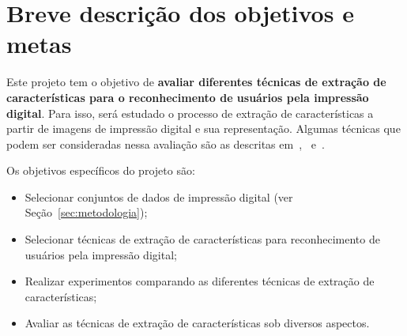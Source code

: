 \section{Breve descrição dos objetivos e metas}
\label{sec:objetivos}

Este projeto tem o objetivo de \textbf{avaliar diferentes técnicas de extração de características para o reconhecimento de usuários pela impressão digital}. Para isso, será estudado o processo de extração de características a partir de imagens de impressão digital e sua representação. Algumas técnicas que podem ser consideradas nessa avaliação são as descritas em~\cite{TangMi2},~\cite{TangMi1} e~\cite{Jin2016}.

Os objetivos específicos do projeto são:

\begin{itemize}
    \item Selecionar conjuntos de dados de impressão digital (ver Seção~\ref{sec:metodologia});
    \item Selecionar técnicas de extração de características para reconhecimento de usuários pela impressão digital;
    \item Realizar experimentos comparando as diferentes técnicas de extração de características;
    \item Avaliar as técnicas de extração de características sob diversos aspectos.
\end{itemize}
